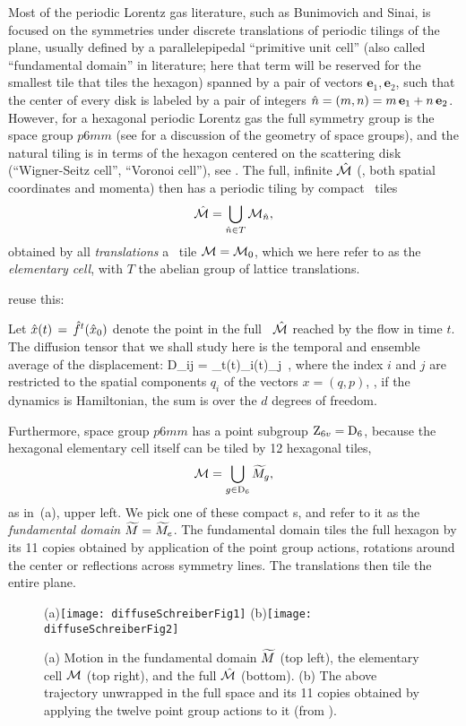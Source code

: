 Most of the periodic Lorentz gas literature, such as Bunimovich and
Sinai, is focused on the symmetries under discrete
translations of periodic tilings of the plane, usually defined by a
parallelepipedal ``primitive unit cell''
(also called ``fundamental domain'' in literature; here that term will
be reserved for the smallest tile that tiles the hexagon)
spanned by a pair of vectors
$\textbf{e}_1,\textbf{e}_2$, such that the center of every disk is
labeled by a pair of integers
$\hat{n}=(m,n)=m\,\textbf{e}_1+n\,\textbf{e}_2$.
However, for a hexagonal periodic Lorentz gas the full symmetry group is
the space group $p6mm$ (see  for a discussion of the
geometry of space groups), and the natural tiling is in terms of the
hexagon centered on the scattering disk (``Wigner-Seitz cell'', ``Voronoi
cell''),  see .
The full, infinite {\statesp} $\hat {{\cal M}}$ (\ie, both spatial coordinates and
momenta) then has a periodic tiling by compact \statesp\ tiles
\[ %
\hM=\bigcup_{ \hn \in T} \pS_{\hn},
\] %
obtained by all {\em translations} a \statesp\ tile ${\cal M}={\cal M}_{0}$, which
we here refer to as the {\em elementary cell}, with $T$ the abelian group
of lattice translations.

     {
reuse this:

Let $\hat x(t)\,=\,{\hat{f}^{t}(\hat x_0)}$ denote the point in the full
\statesp\ $\hat {{\cal M}}$ reached by the flow in time $t$. The diffusion tensor
that we shall study here
is the temporal and ensemble average of the displacement: \beq D_{ij}
=
\lim_{t\to\infty}\left\langle\hx(t)_i\hx(t)_j\right\rangle
 \,, \label{eq-diff-def} \eeq where the index $i$ and $j$ are
restricted to the spatial components $q_i$ of the {\statesp} vectors
$x=(q,p)$, \ie, if the dynamics is Hamiltonian, the sum is over the
$d$ degrees of freedom.
    }


Furthermore, space group $p6mm$ has a point subgroup $\textrm{Z}_{6v}=\textrm{D}_{6}$,
because the hexagonal elementary cell itself can be tiled by 12
hexagonal tiles,
\[ %
\pS=\bigcup_{\LieEl \in \Dn{6}} \tM_\LieEl,
\] %
as in \,(a), upper left. We pick one of these
compact \statesp s, and refer to it as the
\emph{fundamental domain} ${\widetilde M}={\widetilde M}_e$. The fundamental domain tiles the
full hexagon by its 11 copies obtained by application of the  point
group actions, rotations around the center or reflections across symmetry
lines. The translations then tile the entire plane.

\begin{figure}[htbp]
  \begin{center}
    (a)\;\texttt{[image: diffuseSchreiberFig1]}
    (b)\texttt{[image: diffuseSchreiberFig2]}
  \end{center}
  \caption[]{\label{fig-schrieberFig12}
  (a) Motion in the fundamental domain ${\widetilde M}$ (top left),
      the elementary cell ${\cal M}$ (top right), and
      the full {\statesp} $\hat {{\cal M}}$ (bottom).
  (b) The above trajectory unwrapped in the full space and its 11 copies
    obtained by applying the twelve  point group actions to it (from
    ).
  }
\end{figure}


